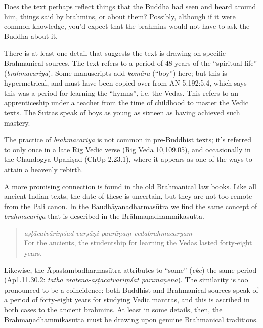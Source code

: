 \documentclass[12pt,openany]{book}%
\begin{document}
Does the text perhaps reflect things that the Buddha had seen and heard around him, things said by brahmins, or about them? Possibly, although if it were common knowledge, you’d expect that the brahmins would not have to ask the Buddha about it.

There is at least one detail that suggests the text is drawing on specific Brahmanical sources. The text refers to a period of 48 years of the “spiritual life” (\textit{brahmacariya}). Some manuscripts add \textit{\textsanskrit{komāra}} (“boy”) here; but this is hypermetrical, and must have been copied over from AN 5.192:5.4, which says this was a period for learning the “hymns”, i.e. the Vedas. This refers to an apprenticeship under a teacher from the time of childhood to master the Vedic texts. The Suttas speak of boys as young as sixteen as having achieved such mastery.

The practice of \textit{brahmacariya} is not common in pre-Buddhist texts; it’s referred to only once in a late Rig Vedic verse (Rig Veda 10,109.05), and occasionally in the Chandogya \textsanskrit{Upaniṣad} (ChUp 2.23.1), where it appears as one of the ways to attain a heavenly rebirth.

A more promising connection is found in the old Brahmanical law books. Like all ancient Indian texts, the date of these is uncertain, but they are not too remote from the Pali canon. In the \textsanskrit{Baudhāyanadharmasūtra} we find the same concept of \textit{brahmacariya} that is described in the \textsanskrit{Brāhmaṇadhammikasutta}.

\begin{quotation}%
\textit{\textsanskrit{aṣṭācatvāriṃśad} \textsanskrit{varṣāṇi} \textsanskrit{paurāṇaṃ} vedabrahmacaryam} \\
For the ancients, the studentship for learning the Vedas lasted forty-eight years.

%
\end{quotation}

Likewise, the \textsanskrit{Āpastambadharmasūtra} attributes to “some” (\textit{eke}) the same period (Ap1.11.30.2: \textit{\textsanskrit{tathā} vratena-\textsanskrit{aṣṭācatvāriṃśat} \textsanskrit{parīmāṇena}}). The similarity is too pronounced to be a coincidence: both Buddhist and Brahmanical sources speak of a period of forty-eight years for studying Vedic mantras, and this is ascribed in both cases to the ancient brahmins. At least in some details, then, the \textsanskrit{Brāhmaṇadhammikasutta} must be drawing upon genuine Brahmanical traditions.
\end{document}
